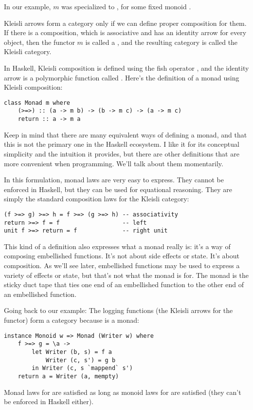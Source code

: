 In our example, $m$ was specialized to , for
some fixed monoid .

Kleisli arrows form a category only if we can define proper composition
for them. If there is a composition, which is associative and has an
identity arrow for every object, then the functor $m$ is called a
, and the resulting category is called the Kleisli category.

In Haskell, Kleisli composition is defined using the fish operator
\code{>=>}, and the identity arrow is a
polymorphic function called . Here's the definition of a
monad using Kleisli composition:

\begin{Verbatim}
class Monad m where 
    (>=>) :: (a -> m b) -> (b -> m c) -> (a -> m c)
    return :: a -> m a
\end{Verbatim}
Keep in mind that there are many equivalent ways of defining a monad,
and that this is not the primary one in the Haskell ecosystem. I like it
for its conceptual simplicity and the intuition it provides, but there
are other definitions that are more convenient when programming. We'll
talk about them momentarily.

In this formulation, monad laws are very easy to express. They cannot be
enforced in Haskell, but they can be used for equational reasoning. They
are simply the standard composition laws for the Kleisli category:

\begin{Verbatim}
(f >=> g) >=> h = f >=> (g >=> h) -- associativity
return >=> f = f                  -- left
unit f >=> return = f             -- right unit
\end{Verbatim}
This kind of a definition also expresses what a monad really is: it's a
way of composing embellished functions. It's not about side effects or
state. It's about composition. As we'll see later, embellished functions
may be used to express a variety of effects or state, but that's not
what the monad is for. The monad is the sticky duct tape that ties one
end of an embellished function to the other end of an embellished
function.

Going back to our  example: The logging functions (the
Kleisli arrows for the  functor) form a category because
 is a monad:

\begin{Verbatim}
instance Monoid w => Monad (Writer w) where
    f >=> g = \a ->
        let Writer (b, s) = f a
            Writer (c, s') = g b
        in Writer (c, s `mappend` s')
    return a = Writer (a, mempty)
\end{Verbatim}
Monad laws for  are satisfied as long as monoid laws
for  are satisfied (they can't be enforced in Haskell either).

